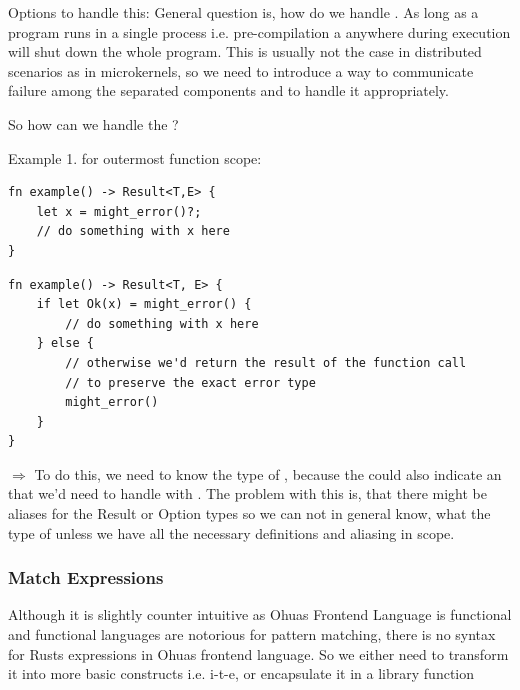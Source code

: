 Options to handle this: 
General question is, how do we handle . As long as a program runs in a single process i.e. pre-compilation a  anywhere during execution will shut down the whole program. This is usually not the case in distributed scenarios as in microkernels, so we need to introduce a way to communicate failure among the separated components and to handle it appropriately.

So how can we handle the ?

Example 1. for outermost function scope:
\begin{verbatim}
fn example() -> Result<T,E> {
    let x = might_error()?;
    // do something with x here
}
\end{verbatim}

\begin{verbatim}
fn example() -> Result<T, E> {
    if let Ok(x) = might_error() {
        // do something with x here
    } else {
        // otherwise we'd return the result of the function call
        // to preserve the exact error type
        might_error() 
    }   
}
\end{verbatim}
$\Rightarrow$ To do this, we need to know the type of , because the  could also indicate an  that we'd need to handle with  . The problem with this is, that there might be aliases for the Result or Option types so we can not in general know, what the type of  unless we have all the necessary definitions and aliasing in scope.\\

\bigskip

\subsubsection{Match Expressions}
Although it is slightly counter intuitive as Ohuas Frontend Language is functional and functional languages are notorious for pattern matching, there is no syntax for Rusts  expressions in Ohuas frontend language. So we either need to transform it into more basic constructs i.e. i-t-e, or encapsulate it in a library function\\


